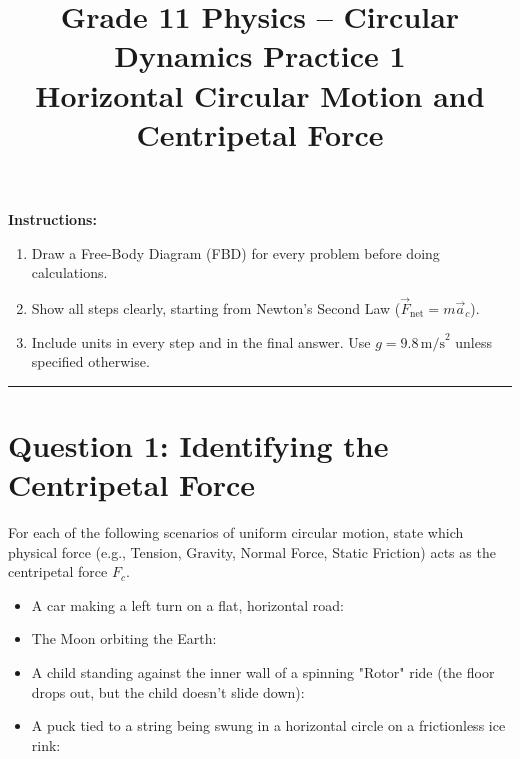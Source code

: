 \documentclass[12pt]{article}
\begin{document}
\title{Grade 11 Physics -- Circular Dynamics Practice 1 \\ \large{Horizontal Circular Motion and Centripetal Force}}
\author{}
\date{}
\maketitle

\vspace{1em}

\textbf{Instructions:}

\begin{enumerate}
\item Draw a Free-Body Diagram (FBD) for every problem before doing calculations.
\item Show all steps clearly, starting from Newton's Second Law ($\vec{F}_{\text{net}} = m\vec{a}_c$).
\item Include units in every step and in the final answer. Use $g = 9.8 \, \text{m/s}^2$ unless specified otherwise.
\end{enumerate}

\noindent\rule{\textwidth}{0.4pt}

\vspace{1em}

\section*{Question 1: Identifying the Centripetal Force}

For each of the following scenarios of uniform circular motion, state which physical force (e.g., Tension, Gravity, Normal Force, Static Friction) acts as the centripetal force $F_c$.

\begin{itemize}
\item[(a)] A car making a left turn on a flat, horizontal road: \underline{\hspace{4cm}}
\vspace{0.8cm}

\item[(b)] The Moon orbiting the Earth: \underline{\hspace{4cm}}
\vspace{0.8cm}

\item[(c)] A child standing against the inner wall of a spinning "Rotor" ride (the floor drops out, but the child doesn't slide down): \underline{\hspace{4cm}}
\vspace{0.8cm}

\item[(d)] A puck tied to a string being swung in a horizontal circle on a frictionless ice rink: \underline{\hspace{4cm}}
\end{itemize}
\end{document}

